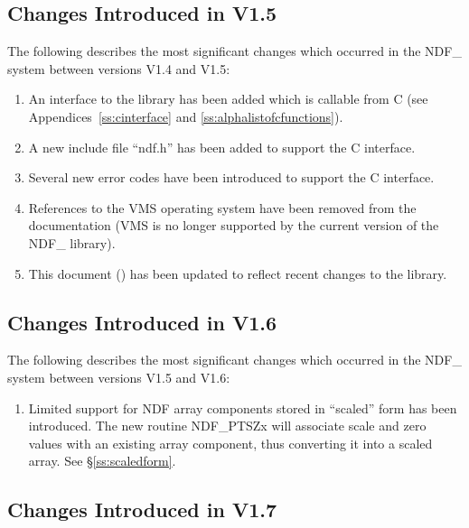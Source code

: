 \documentclass[twoside,11pt,nolof]{starlink}
\begin{document}
\subsection{Changes Introduced in V1.5}

The following describes the most significant changes which occurred in
the NDF\_ system between versions V1.4 and V1.5:

\begin{enumerate}
\item An interface to the library has been added which is callable
from C (see Appendices~\ref{ss:cinterface} and
\ref{ss:alphalistofcfunctions}).

\item A new include file ``ndf.h'' has been added to support the
C interface.

\item Several new error codes have been introduced to support the C
interface.

\item References to the VMS operating system have been removed from
the documentation (VMS is no longer supported by the current version
of the NDF\_ library).

\item This document () has been updated to
reflect recent changes to the library.
\end{enumerate}

\subsection{Changes Introduced in V1.6}

The following describes the most significant changes which occurred in
the NDF\_ system between versions V1.5 and V1.6:

\begin{enumerate}
\item Limited support for NDF array components stored in ``scaled'' form
has been introduced. The new routine NDF\_PTSZx will associate scale and
zero values with an existing array component, thus converting it into a
scaled array. See \S\ref{ss:scaledform}.

\end{enumerate}

\subsection{Changes Introduced in V1.7}
\end{document}

